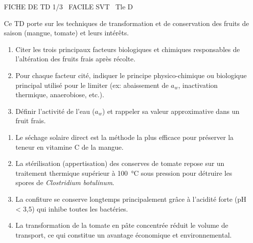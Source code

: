 \documentclass[11pt]{article}
\begin{document}
\begin{tcolorbox}[enhanced,colback=popink,colframe=popink,arc=10pt,boxrule=0pt,left=12pt,right=12pt,top=9pt,bottom=9pt]
{\color{white}\popxbold\small FICHE DE TD 1/3 \textbullet\ FACILE \hfill SVT \textbullet\ Tle D\par}
\end{tcolorbox}
\vspace{4pt}
Ce TD porte sur les techniques de transformation et de conservation des fruits de saison (mangue, tomate) et leurs intérêts.

\begin{exercice}
\begin{enumerate}
    \item Citer les trois principaux facteurs biologiques et chimiques responsables de l'altération des fruits frais après récolte.
    \item Pour chaque facteur cité, indiquer le principe physico-chimique ou biologique principal utilisé pour le limiter (ex: abaissement de $a_w$, inactivation thermique, anaerobiose, etc.).
    \item Définir l'activité de l'eau ($a_w$) et rappeler sa valeur approximative dans un fruit frais.
\end{enumerate}
\end{exercice}

\begin{exercice}
\begin{enumerate}
    \item Le séchage solaire direct est la méthode la plus efficace pour préserver la teneur en vitamine C de la mangue.
    \item La stérilisation (appertisation) des conserves de tomate repose sur un traitement thermique supérieur à \SI{100}{\celsius} sous pression pour détruire les spores de \textit{Clostridium botulinum}.
    \item La confiture se conserve longtemps principalement grâce à l'acidité forte (pH < 3,5) qui inhibe toutes les bactéries.
    \item La transformation de la tomate en pâte concentrée réduit le volume de transport, ce qui constitue un avantage économique et environnemental.
\end{enumerate}
\end{exercice}
\end{document}
